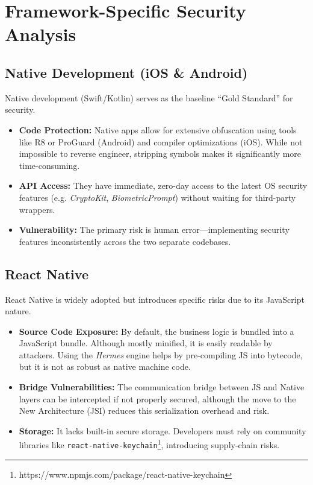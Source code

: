 \section{Framework-Specific Security Analysis}

\subsection{Native Development (iOS \& Android)}
Native development (Swift/Kotlin) serves as the baseline ``Gold Standard'' for security.
\begin{itemize}
    \item \textbf{Code Protection:} Native apps allow for extensive obfuscation using tools like R8 or ProGuard (Android) and compiler optimizations (iOS). While not impossible to reverse engineer, stripping symbols makes it significantly more time-consuming.
    \item \textbf{API Access:} They have immediate, zero-day access to the latest OS security features (e.g. \textit{CryptoKit}, \textit{BiometricPrompt}) without waiting for third-party wrappers.
    \item \textbf{Vulnerability:} The primary risk is human error—implementing security features inconsistently across the two separate codebases.
\end{itemize}

\subsection{React Native}
React Native is widely adopted but introduces specific risks due to its JavaScript nature.
\begin{itemize}
    \item \textbf{Source Code Exposure:} By default, the business logic is bundled into a JavaScript bundle. Although mostly minified, it is easily readable by attackers. Using the \textit{Hermes} engine helps by pre-compiling JS into bytecode, but it is not as robust as native machine code.
    \item \textbf{Bridge Vulnerabilities:} The communication bridge between JS and Native layers can be intercepted if not properly secured, although the move to the New Architecture (JSI) reduces this serialization overhead and risk.
    \item \textbf{Storage:} It lacks built-in secure storage. Developers must rely on community libraries like \texttt{react-native-keychain}\footnote{https://www.npmjs.com/package/react-native-keychain}, introducing supply-chain risks.
\end{itemize}

